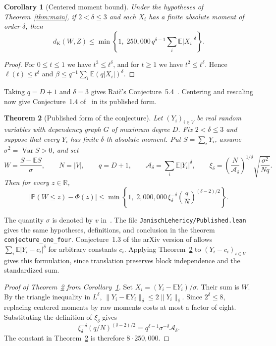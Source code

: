 \documentclass[11pt,a4paper]{article}
\newtheorem{theorem}{Theorem}
\newtheorem{corollary}[theorem]{Corollary}
\newcommand{\E}{\mathbb E}
\newcommand{\PP}{\mathbb P}
\newcommand{\R}{\mathbb R}
\newcommand{\Var}{\operatorname{Var}}
\newcommand{\dK}{d_{\mathrm K}}
\begin{document}
\begin{corollary}[Centered moment bound]\label{cor:jl}
Under the hypotheses of Theorem~\ref{thm:main}, if $2<\delta\le3$ and
each $X_i$ has a finite absolute moment of order $\delta$, then
\[
 \dK(W,Z)\le\min\!\left\{1,\;250{,}000\,q^{\delta-1}\sum_i\E|X_i|^\delta\right\}.
\]
\end{corollary}
\begin{proof}
For $0\le t\le1$ we have $t^3\le t^\delta$, and for $t\ge1$ we have
$t^2\le t^\delta$. Hence $\ell(t)\le t^\delta$ and
$\beta\le q^{-1}\sum_i\E(q|X_i|)^\delta$.
\end{proof}

Taking $q=D+1$ and $\delta=3$ gives Raič's Conjecture~5.4~\cite{Raic}.
Centering and rescaling now give Conjecture~1.4 of~\cite{JL} in its
published form.

\begin{theorem}[Published form of the conjecture]\label{thm:published}
Let $(Y_i)_{i\in V}$ be real random variables with dependency graph $G$ of
maximum degree $D$. Fix $2<\delta\le3$ and suppose that every $Y_i$ has finite
$\delta$-th absolute moment. Put $S=\sum_iY_i$, assume $\sigma^2=\Var S>0$, and set
\[
 W=\frac{S-\E S}{\sigma},\qquad N=|V|,\qquad q=D+1,\qquad
 \mathcal A_\delta=\sum_i\E|Y_i|^\delta,\qquad
 \xi_\delta=\left(\frac{N}{\mathcal A_\delta}\right)^{1/\delta}
              \sqrt{\frac{\sigma^2}{Nq}}.
\]
Then for every $z\in\R$,
\[
 \big|\PP(W\le z)-\Phi(z)\big|
 \le \min\!\left\{1,\;2{,}000{,}000\,\xi_\delta^{-\delta}
                   \left(\frac q N\right)^{(\delta-2)/2}\right\}.
\]
\end{theorem}
The quantity $\sigma$ is denoted by $v$ in~\cite{JL}.
The file
\texttt{JanischLehericy/Published.lean} gives the same hypotheses, definitions,
and conclusion in the theorem \texttt{conjecture\_one\_four}. Conjecture~1.3 of
the arXiv version of \cite{JL} allows $\sum_i\E|Y_i-c_i|^\delta$ for arbitrary
constants $c_i$. Applying Theorem~\ref{thm:published} to $(Y_i-c_i)_{i\in V}$
gives this formulation, since translation preserves block independence and the
standardized sum.

\begin{proof}[Proof of Theorem~\ref{thm:published} from Corollary~\ref{cor:jl}]
Set $X_i=(Y_i-\E Y_i)/\sigma$. Their sum is $W$. By the triangle inequality
in $L^\delta$, $\|Y_i-\E Y_i\|_\delta\le2\|Y_i\|_\delta$. Since $2^\delta\le8$,
replacing centered moments by raw moments costs at most a factor of eight.
Substituting the definition of $\xi_\delta$ gives
\[
 \xi_\delta^{-\delta}(q/N)^{(\delta-2)/2}
 = q^{\delta-1}\sigma^{-\delta}\mathcal A_\delta .
\]
The constant in Theorem~\ref{thm:published} is therefore $8\cdot250{,}000$.
\end{proof}
\end{document}

